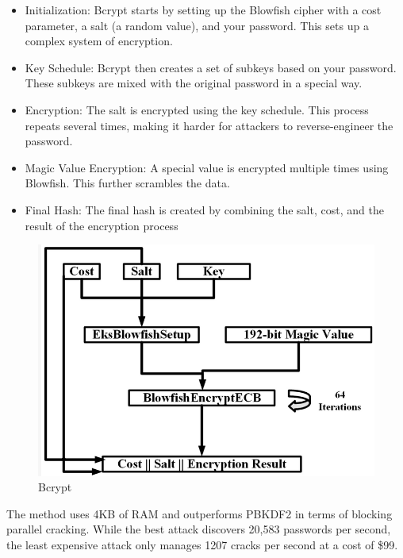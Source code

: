\documentclass[10pt,oneside,english,a4paper]{article}
\begin{document}
\begin{itemize}
\item Initialization: Bcrypt starts by setting up the Blowfish cipher with a cost parameter, a salt (a random value), and your password. This sets up a complex system of encryption.

\item Key Schedule: Bcrypt then creates a set of subkeys based on your password. These subkeys are mixed with the original password in a special way.

\item Encryption: The salt is encrypted using the key schedule. This process repeats several times, making it harder for attackers to reverse-engineer the password.

\item Magic Value Encryption: A special value is encrypted multiple times using Blowfish. This further scrambles the data.

\item Final Hash: The final hash is created by combining the salt, cost, and the result of the encryption process
\end{itemize}

\begin{figure}[h]
	\centering
	\includegraphics[scale = 0.40]{Bcrypt.png}
	\caption{Bcrypt}
	\label{}
\end{figure}

The method uses 4KB of RAM and outperforms PBKDF2 in terms of blocking parallel cracking. While the best attack discovers 20,583 passwords per second, the least expensive attack only manages 1207 cracks per second at a cost of \$99.
\end{document}
